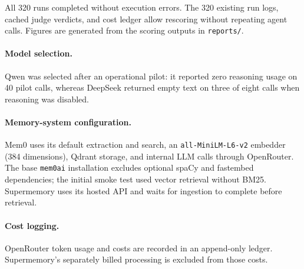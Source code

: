 All 320 runs completed without execution errors.
The 320 existing run logs, cached judge verdicts,
and cost ledger allow rescoring without repeating
agent calls. Figures are generated from the
scoring outputs in \texttt{reports/}.

\paragraph{Model selection.} Qwen was selected after an
operational pilot: it reported zero reasoning usage on
40 pilot calls, whereas DeepSeek returned empty text on
three of eight calls when reasoning was disabled.

\paragraph{Memory-system configuration.} Mem0 uses its
default extraction and search, an
\texttt{all-MiniLM-L6-v2} embedder (384 dimensions),
Qdrant storage, and internal LLM calls through
OpenRouter. The base \texttt{mem0ai} installation
excludes optional spaCy and fastembed dependencies;
the initial smoke test used vector retrieval without
BM25. Supermemory uses its hosted API and waits for
ingestion to complete before retrieval.

\paragraph{Cost logging.} OpenRouter token usage and
costs are recorded in an append-only ledger.
Supermemory's separately billed processing is excluded
from those costs.
